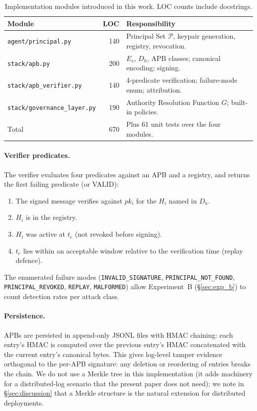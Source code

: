 \documentclass[11pt]{article}
\newcommand{\Pset}{\mathcal{P}}
\newcommand{\Es}{E_s}
\newcommand{\Dh}{D_h}
\newcommand{\Hi}{H_i}
\newcommand{\pki}{pk_i}
\newcommand{\APB}{\mathrm{APB}}
\begin{document}
\begin{table}[t]
\centering
\caption{Implementation modules introduced in this work.
LOC counts include docstrings.}
\label{tab:modules}
\small
\begin{tabular}{lrl}
\toprule
Module & LOC & Responsibility \\
\midrule
\texttt{agent/principal.py}        & 140 & Principal Set $\Pset$, keypair generation, registry, revocation. \\
\texttt{stack/apb.py}              & 200 & $\Es$, $\Dh$, $\APB$ classes; canonical encoding; signing. \\
\texttt{stack/apb\_verifier.py}    & 140 & 4-predicate verification; failure-mode enum; attribution. \\
\texttt{stack/governance\_layer.py}& 190 & Authority Resolution Function $G$; built-in policies. \\
\midrule
Total                              & 670 & Plus 61 unit tests over the four modules. \\
\bottomrule
\end{tabular}
\end{table}

\paragraph{Verifier predicates.}
The verifier evaluates four predicates against an APB and a
registry, and returns the first failing predicate (or VALID):
\begin{enumerate}[leftmargin=2em, topsep=2pt, itemsep=1pt]
  \item[V1.] The signed message verifies against $\pki$ for the
        $\Hi$ named in $\Dh$.
  \item[V2.] $\Hi$ is in the registry.
  \item[V3.] $\Hi$ was active at $t_e$ (not revoked before signing).
  \item[V4.] $t_e$ lies within an acceptable window relative to the
        verification time (replay defence).
\end{enumerate}
The enumerated failure modes (\texttt{INVALID\_SIGNATURE},
\texttt{PRINCIPAL\_NOT\_FOUND}, \texttt{PRINCIPAL\_REVOKED},
\texttt{REPLAY}, \texttt{MALFORMED}) allow Experiment~B
(\S\ref{sec:exp_b}) to count detection rates per attack class.

\paragraph{Persistence.}
APBs are persisted in append-only JSONL files with HMAC chaining:
each entry's HMAC is computed over the previous entry's HMAC
concatenated with the current entry's canonical bytes. This gives
log-level tamper evidence orthogonal to the per-APB signature: any
deletion or reordering of entries breaks the chain. We do not use a
Merkle tree in this implementation (it adds machinery for a
distributed-log scenario that the present paper does not need); we
note in \S\ref{sec:discussion} that a Merkle structure is the
natural extension for distributed deployments.
\end{document}
